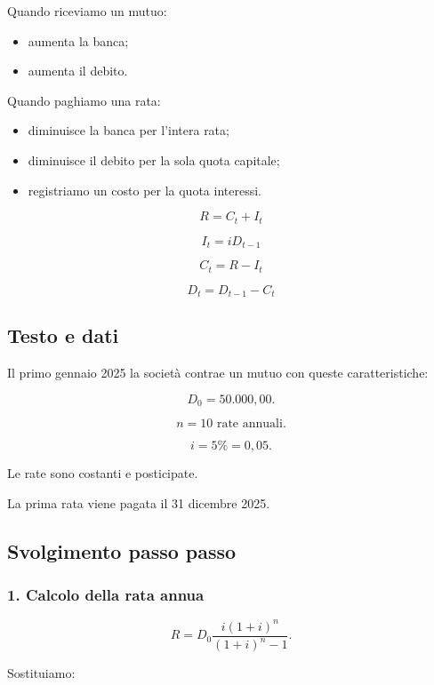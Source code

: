 \noindent Quando riceviamo un mutuo:

\begin{itemize}
    \item aumenta la banca;
    \item aumenta il debito.
\end{itemize}

\noindent Quando paghiamo una rata:

\begin{itemize}
    \item diminuisce la banca
    per l'intera rata;

    \item diminuisce il debito
    per la sola quota capitale;

    \item registriamo un costo
    per la quota interessi.
\end{itemize}

\[
\boxed{
R=C_t+I_t
}
\]

\[
\boxed{
I_t=iD_{t-1}
}
\]

\[
\boxed{
C_t=R-I_t
}
\]

\[
\boxed{
D_t=D_{t-1}-C_t
}
\]


\subsection*{Testo e dati}

\noindent Il primo gennaio 2025
la società contrae un mutuo
con queste caratteristiche:

\[
D_0=50.000{,}00.
\]

\[
n=10\text{ rate annuali}.
\]

\[
i=5\%=0{,}05.
\]

\noindent Le rate sono costanti
e posticipate.

\noindent La prima rata viene pagata
il 31 dicembre 2025.


\subsection*{Svolgimento passo passo}

\subsubsection*{1. Calcolo della rata annua}

\[
R=
D_0
\frac{i(1+i)^n}
{(1+i)^n-1}.
\]

\noindent Sostituiamo:

